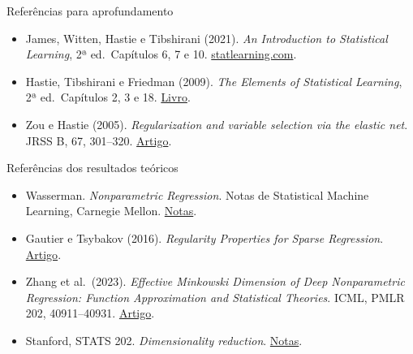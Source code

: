 \documentclass[
  10pt,
  ignorenonframetext,
  aspectratio=169,
  brazilian,
]{beamer}
\providecommand{\tightlist}{%
  \setlength{\itemsep}{0pt}\setlength{\parskip}{0pt}}
\begin{document}
\begin{frame}{Referências para aprofundamento}
\protect{}\label{referuxeancias-para-aprofundamento}
\begin{itemize}
\tightlist
\item
  James, Witten, Hastie e Tibshirani (2021). \emph{An Introduction to
  Statistical Learning}, 2ª ed.~Capítulos 6, 7 e 10.
  \href{https://www.statlearning.com/}{statlearning.com}.
\item
  Hastie, Tibshirani e Friedman (2009). \emph{The Elements of
  Statistical Learning}, 2ª ed.~Capítulos 2, 3 e 18.
  \href{https://hastie.su.domains/ElemStatLearn/}{Livro}.
\item
  Zou e Hastie (2005). \emph{Regularization and variable selection via
  the elastic net}. JRSS B, 67, 301--320.
  \href{https://web.stanford.edu/~hastie/Papers/elasticnet.pdf}{Artigo}.
\end{itemize}
\end{frame}

\begin{frame}{Referências dos resultados teóricos}
\protect{}\label{referuxeancias-dos-resultados-teuxf3ricos}
\begin{itemize}
\tightlist
\item
  Wasserman. \emph{Nonparametric Regression}. Notas de Statistical
  Machine Learning, Carnegie Mellon.
  \href{https://stat.cmu.edu/~larry/=sml/nonpar.pdf}{Notas}.
\item
  Gautier e Tsybakov (2016). \emph{Regularity Properties for Sparse
  Regression}.
  \href{https://pmc.ncbi.nlm.nih.gov/articles/mid/NIHMS750383/}{Artigo}.
\item
  Zhang et al.~(2023). \emph{Effective Minkowski Dimension of Deep
  Nonparametric Regression: Function Approximation and Statistical
  Theories}. ICML, PMLR 202, 40911--40931.
  \href{https://proceedings.mlr.press/v202/zhang23f.html}{Artigo}.
\item
  Stanford, STATS 202. \emph{Dimensionality reduction}.
  \href{https://web.stanford.edu/class/stats202/notes/Model-selection/Dimensionality-reduction.html}{Notas}.
\end{itemize}
\end{frame}
\end{document}
